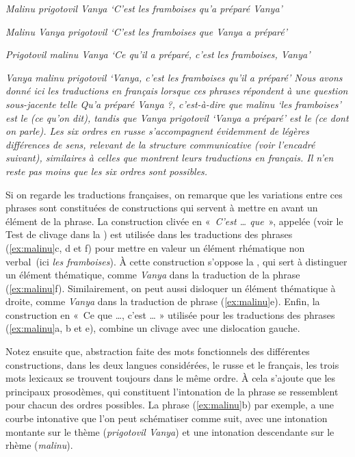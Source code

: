 {    \ex\itshape Malinu prigotovil Vanya
    \glt  ‘C’est les framboises qu’a préparé Vanya’

    \ex\itshape Malinu Vanya prigotovil
    \glt   ‘C’est les framboises que Vanya a préparé’

    \ex\itshape Prigotovil malinu Vanya
    \glt ‘Ce qu’il a préparé, c’est les framboises, Vanya’

    \ex\itshape Vanya malinu prigotovil
    \glt  ‘Vanya, c’est les framboises qu’il a préparé’
\z
\z
    Nous avons donné ici les traductions en français lorsque ces phrases répondent à une question sous-jacente telle \textit{Qu’a préparé Vanya} ?, c’est-à-dire que \textit{malinu} ‘les framboises’ est le  (ce qu’on dit), tandis que \textit{Vanya prigotovil} ‘Vanya a préparé’ est le  (ce dont on parle). Les six ordres en russe s’accompagnent évidemment de légères différences de sens, relevant de la structure communicative (voir l’encadré suivant), similaires à celles que montrent leurs traductions en français. Il n’en reste pas moins que les six ordres sont possibles.

    Si on regarde les traductions françaises, on remarque que les variations entre ces phrases sont constituées de constructions qui servent à mettre en avant un élément de la phrase. La construction clivée en «~\textit{C’est … que}~», appelée  (voir le Test de clivage dans la ) est utilisée dans les traductions des phrases (\ref{ex:malinu}c, d et f) pour mettre en valeur un élément rhématique non verbal~(ici \textit{les framboises}). À cette construction s’oppose la , qui sert à distinguer un élément thématique, comme \textit{Vanya} dans la traduction de la phrase (\ref{ex:malinu}f). Similairement, on peut aussi disloquer un élément thématique à droite, comme \textit{Vanya} dans la traduction de phrase (\ref{ex:malinu}e). Enfin, la construction  en «~Ce que …, c’est … » utilisée pour les traductions des phrases (\ref{ex:malinu}a, b et e), combine un clivage avec une dislocation gauche.  
    
    
    Notez ensuite que, abstraction faite des mots fonctionnels des différentes constructions, dans les deux langues considérées, le russe et le français, les trois mots lexicaux se trouvent toujours dans le même ordre. À cela s’ajoute que les principaux prosodèmes, qui constituent l’intonation de la phrase se ressemblent pour chacun des ordres possibles. La phrase (\ref{ex:malinu}b) par exemple, a une courbe intonative que l’on peut schématiser comme suit, avec une intonation montante sur le thème (\textit{prigotovil Vanya}) et une intonation descendante sur le rhème (\textit{malinu}).

}
